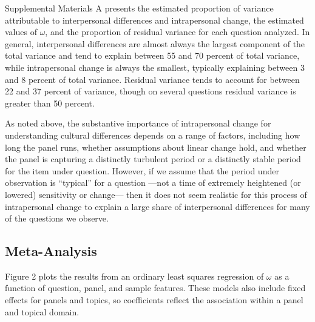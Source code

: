 \documentclass[
  12pt,
]{article}
\begin{document}
Supplemental Materials A presents the estimated proportion of variance
attributable to interpersonal differences and intrapersonal change, the
estimated values of \(\omega\), and the proportion of residual variance
for each question analyzed. In general, interpersonal differences are
almost always the largest component of the total variance and tend to
explain between 55 and 70 percent of total variance, while intrapersonal
change is always the smallest, typically explaining between 3 and 8
percent of total variance. Residual variance tends to account for
between 22 and 37 percent of variance, though on several questions
residual variance is greater than 50 percent.

As noted above, the substantive importance of intrapersonal change for
understanding cultural differences depends on a range of factors,
including how long the panel runs, whether assumptions about linear
change hold, and whether the panel is capturing a distinctly turbulent
period or a distinctly stable period for the item under question.
However, if we assume that the period under observation is ``typical''
for a question ---not a time of extremely heightened (or lowered)
sensitivity or change--- then it does not seem realistic for this
process of intrapersonal change to explain a large share of
interpersonal differences for many of the questions we observe.

\hypertarget{meta-analysis}{%
\subsection{Meta-Analysis}\label{meta-analysis}}

Figure 2 plots the results from an ordinary least squares regression of
\(\omega\) as a function of question, panel, and sample features. These
models also include fixed effects for panels and topics, so coefficients
reflect the association within a panel and topical domain.
\end{document}
